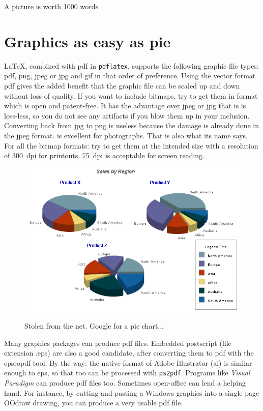 \renewcommand\TheFile{ch04_graphics.tex}

\begin{savequote}[15cm]
  \vspace{-30mm}
  \raggedleft
  \sffamily
A picture is worth 1000 words
\end{savequote}
\chapter{Graphics as easy as pie}
\LaTeX, combined with pdf in \texttt{pdflatex}, supports the following
graphic file types: pdf, png, jpeg or jpg and gif in that order of
preference. Using the vector format pdf gives the added benefit that
the graphic file can be scaled up and down without loss of quality.
If you want to include bitmaps, try to get them in  format which
is open and patent-free. It has the advantage over jpeg or jpg that is is
loss-less, so you do not see any artifacts if you blow them up in your
inclusion. Converting back from jpg to png is useless because the
damage is already done in the jpeg format.  is excellent for
photographs. That is also what its name says. For all the bitmap formats: try to get them at the
intended size with a resolution of 300~dpi for printouts. 75~dpi is
acceptable for screen reading.
  
\begin{figure}[thbp]
  \centering
  \includegraphics[width=.8\textwidth]{images/servlet3.png}
  \caption[A Pie chart]{Stolen from the net. Google for a pie chart...}
  \label{fig:pie}
\end{figure}

Many graphics packages can produce pdf files.
Embedded postscript (file extension .eps) are also a good candidate,
after converting them to pdf with the epstopdf tool. By the way: the
native format of Adobe Illustrator (ai) is similar enough to eps, so
that too can be processed with \texttt{ps2pdf}. Programs like {\em Visual
  Paradigm} can produce pdf files too. Sometimes open-office can
lend a helping hand. For instance, by cutting and pasting a Windows graphics into a single page OOdraw drawing, you can produce a very usable pdf file. 

